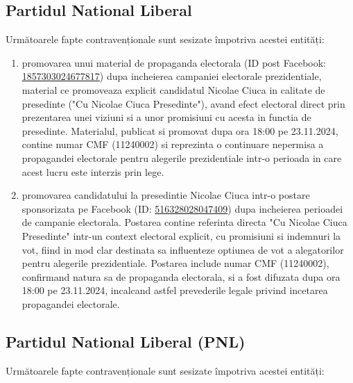 \documentclass[a4paper,12pt]{article}
\begin{document}
\vspace{0.5cm}

\subsection{Partidul National Liberal}
Următoarele fapte contravenționale sunt sesizate împotriva acestei entități:

\begin{enumerate}[leftmargin=*, label=\arabic*.)]
    \item promovarea unui material de propaganda electorala (ID post Facebook: \href{https://www.facebook.com/ads/library/?id=1857303024677817}{1857303024677817}) dupa incheierea campaniei electorale prezidentiale, material ce promoveaza explicit candidatul Nicolae Ciuca in calitate de presedinte ("Cu Nicolae Ciuca Presedinte"), avand efect electoral direct prin prezentarea unei viziuni si a unor promisiuni cu acesta in functia de presedinte. Materialul, publicat si promovat dupa ora 18:00 pe 23.11.2024, contine numar CMF (11240002) si reprezinta o continuare nepermisa a propagandei electorale pentru alegerile prezidentiale intr-o perioada in care acest lucru este interzis prin lege.
    \item promovarea candidatului la presedintie Nicolae Ciuca intr-o postare sponsorizata pe Facebook (ID: \href{https://www.facebook.com/ads/library/?id=516328028047409}{516328028047409}) dupa incheierea perioadei de campanie electorala. Postarea contine referinta directa "Cu Nicolae Ciuca Presedinte" intr-un context electoral explicit, cu promisiuni si indemnuri la vot, fiind in mod clar destinata sa influenteze optiunea de vot a alegatorilor pentru alegerile prezidentiale. Postarea include numar CMF (11240002), confirmand natura sa de propaganda electorala, si a fost difuzata dupa ora 18:00 pe 23.11.2024, incalcand astfel prevederile legale privind incetarea propagandei electorale.
\end{enumerate}

\vspace{0.5cm}

\subsection{Partidul National Liberal (PNL)}
Următoarele fapte contravenționale sunt sesizate împotriva acestei entități:
\end{document}
